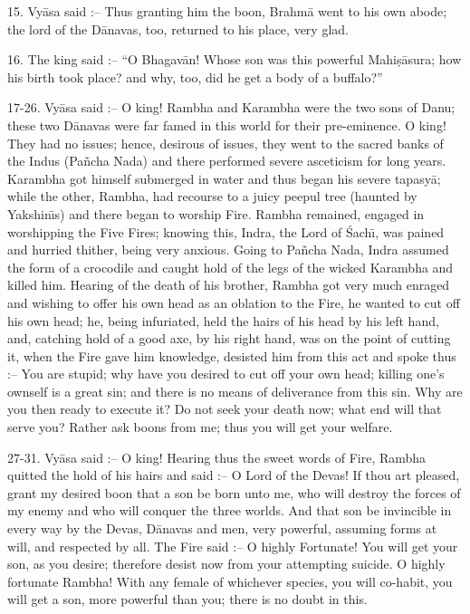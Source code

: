 15. Vy\=asa said :-- Thus granting him the boon, Brahm\=a went to his own abode; the lord of the D\=anavas, too, returned to his place, very glad.

16. The king said :-- ``O Bhagav\=an! Whose son was this powerful Mahi\d{s}\=asura; how his birth took place? and why, too, did he get a body of a buffalo?''

17-26. Vy\=asa said :-- O king! Rambha and Karambha were the two sons of Danu; these two D\=anavas were far famed in this world for their pre-eminence. O king! They had no issues; hence, desirous of issues, they went to the sacred banks of the Indus (Pa\~ncha Nada) and there performed severe asceticism for long years. Karambha got himself submerged in water and thus began his severe tapasy\=a; while the other, Rambha, had recourse to a juicy peepul tree (haunted by Yakshin\={\i}s) and there began to worship Fire. Rambha remained, engaged in worshipping the Five Fires; knowing this, Indra, the Lord of \'Sach\={\i}, was pained and hurried thither, being very anxious. Going to Pa\~ncha Nada, Indra assumed the form of a crocodile and caught hold of the legs of the wicked Karambha and killed him. Hearing of the death of his brother, Rambha got very much enraged and wishing to offer his own head as an oblation to the Fire, he wanted to cut off his own head; he, being infuriated, held the hairs of his head by his left hand, and, catching hold of a good axe, by his right hand, was on the point of cutting it, when the Fire gave him knowledge, desisted him from this act and spoke thus :-- You are stupid; why have you desired to cut off your own head; killing one's ownself is a great sin; and there is no means of deliverance from this sin. Why are you then ready to execute it? Do not seek your death now; what end will that serve you? Rather ask boons from me; thus you will get your welfare.

27-31. Vy\=asa said :-- O king! Hearing thus the sweet words of Fire, Rambha quitted the hold of his hairs and said :-- O Lord of the Devas! If thou art pleased, grant my desired boon that a son be born unto me, who will destroy the forces of my enemy and who will conquer the three worlds. And that son be invincible in every way by the Devas, D\=anavas and men, very powerful, assuming forms at will, and respected by all. The Fire said :-- O highly Fortunate! You will get your son, as you desire; therefore desist now from your attempting suicide. O highly fortunate Rambha! With any female of whichever species, you will co-habit, you will get a son, more powerful than you; there is no doubt in this.

